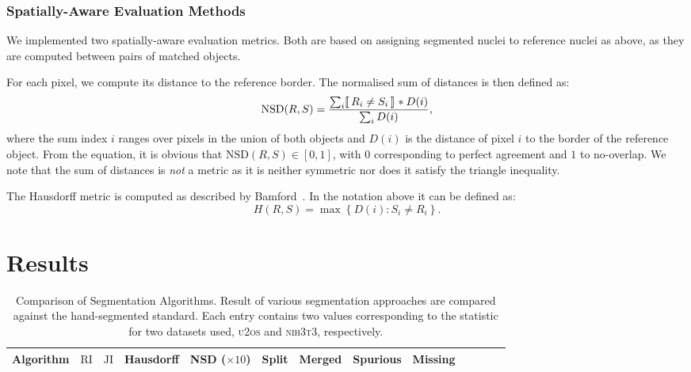 \documentclass{article}
\newcommand*{\indicator}[1]{\hspace{1pt}[\hspace{-.4em}[\hspace{3pt} #1 \hspace{3pt}]\hspace{-.4em}]\hspace{2pt}}
\newcommand*{\ttt}{\textsc{nih}{\footnotesize 3}\textsc{t}{\footnotesize 3}}
\newcommand*{\utos}{\textsc{u{\footnotesize 2}os}}
\begin{document}
\subsubsection{Spatially-Aware Evaluation Methods}

We implemented two spatially-aware evaluation metrics. Both are based on assigning segmented nuclei to reference nuclei as above, as they are computed between pairs of matched objects. 

For each pixel, we compute its distance to the reference border. The normalised sum of distances is then defined as:
%
\begin{equation}
\text{NSD}(R,S) = \frac{\sum_{i}^{} \indicator{R_i \ne S_i}*D(i)} {\sum_{i}^{} D(i)},
\label{eq:nd}
\end{equation}%
where the sum index $i$ ranges over pixels in the union of both objects and $D(i)$ is the distance of pixel $i$ to the border of the reference object. From the equation, it is obvious that $\text{NSD}(R,S) \in [0,1]$, with $0$ corresponding to perfect agreement and $1$ to no-overlap. We note that the sum of distances is \emph{not} a metric as it is neither symmetric nor does it satisfy the triangle inequality. 

The Hausdorff metric is computed as described by Bamford~\cite{Bamford2003Empirical}. In the notation above it can be defined as:
%
\begin{equation}
H(R,S) = \max \left\{ D(i) : S_i \ne R_i \right\}.
\end{equation}
\section{Results}\label{sec:results}

\begin{table*}
\centering
\begin{tabular}{lcccccccccccc}
\toprule
Algorithm              & $\text{RI}$ & $\text{JI}$ & Hausdorff     & NSD ($\times 10$)          &   Split      & Merged      &   Spurious    & Missing     \\
\midrule                                                                                                                                   

\bottomrule
\end{tabular}
\caption{Comparison of Segmentation Algorithms. Result of various segmentation approaches are compared against the hand-segmented standard. Each entry contains two values corresponding to the statistic for two datasets used, \utos{} and \ttt{}, respectively.}
\label{tab:comparison}
\end{table*}
\end{document}
